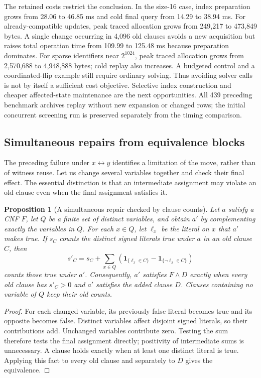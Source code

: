 \documentclass[11pt,a4paper]{article}
\numberwithin{equation}{section}
\theoremstyle{plain}
\newtheorem{proposition}[lemma]{Proposition}
\theoremstyle{definition}
\theoremstyle{remark}
\begin{document}
The retained costs restrict the conclusion. In the size-16 case, index preparation grows from 28.06 to 46.85 ms and cold final query from 14.29 to 38.94 ms. For already-compatible updates, peak traced allocation grows from 249,217 to 473,849 bytes. A single change occurring in 4,096 old clauses avoids a new acquisition but raises total operation time from 109.99 to 125.48 ms because preparation dominates. For sparse identifiers near $2^{1024}$, peak traced allocation grows from 2,570,688 to 4,948,888 bytes; cold replay also increases. A budgeted control and a coordinated-flip example still require ordinary solving. Thus avoiding solver calls is not by itself a sufficient cost objective. Selective index construction and cheaper affected-state maintenance are the next opportunities. All 439 preceding benchmark archives replay without new expansion or changed rows; the initial concurrent screening run is preserved separately from the timing comparison.

\subsection{Simultaneous repairs from equivalence blocks}
\label{sec:joint-repair}

The preceding failure under $x\leftrightarrow y$ identifies a limitation of the move, rather than of witness reuse. Let us change several variables together and check their final effect. The essential distinction is that an intermediate assignment may violate an old clause even when the final assignment satisfies it.

\begin{proposition}[A simultaneous repair checked by clause counts]
\label{prop:joint-repair}
Let $a$ satisfy a CNF $F$, let $Q$ be a finite set of distinct variables, and obtain $a'$ by complementing exactly the variables in $Q$. For each $x\in Q$, let $\ell_x$ be the literal on $x$ that $a'$ makes true. If $s_C$ counts the distinct signed literals true under $a$ in an old clause $C$, then
\[
s'_C=s_C+\sum_{x\in Q}\left(
\mathbf{1}_{\{\ell_x\in C\}}-\mathbf{1}_{\{\neg\ell_x\in C\}}\right)
\]
counts those true under $a'$. Consequently, $a'$ satisfies $F\land D$ exactly when every old clause has $s'_C>0$ and $a'$ satisfies the added clause $D$. Clauses containing no variable of $Q$ keep their old counts.
\end{proposition}

\begin{proof}
For each changed variable, its previously false literal becomes true and its opposite becomes false. Distinct variables affect disjoint signed literals, so their contributions add. Unchanged variables contribute zero. Testing the sum therefore tests the final assignment directly; positivity of intermediate sums is unnecessary. A clause holds exactly when at least one distinct literal is true. Applying this fact to every old clause and separately to $D$ gives the equivalence.
\end{proof}
\end{document}

